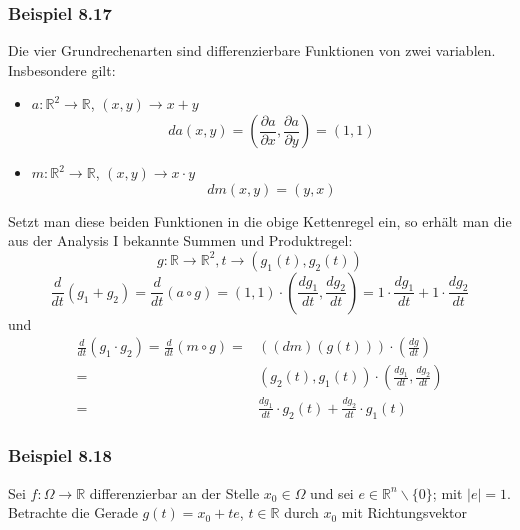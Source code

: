 \subsubsection*{Beispiel 8.17}
Die vier Grundrechenarten sind differenzierbare Funktionen von zwei variablen. Insbesondere gilt: 
\begin{itemize}
\item $a:\mathbb{R}^2\rightarrow\mathbb{R}$, $\left( x,y\right) \rightarrow x+y$ \[da\left( {x,y} \right) = \left( {\frac{{\partial a}}{{\partial x}},\frac{{\partial a}}{{\partial y}}} \right) = \left( {1,1} \right)\]
\item $m:\mathbb{R}^2\rightarrow \mathbb{R}$, $\left( x,y\right) \rightarrow x\cdot y$ \[dm\left( {x,y} \right) = \left( {y,x} \right)\]
\end{itemize}
Setzt man diese beiden Funktionen in die obige Kettenregel ein, so erhält man die aus der Analysis I bekannte Summen und Produktregel: 
$$g:\mathbb{R}\rightarrow\mathbb{R}^2, t\rightarrow \left( g_1(t),g_2(t)\right)$$
\[\frac{d}{{dt}}\left( {{g_1} + {g_2}} \right) = \frac{d}{{dt}}\left( {a \circ g} \right) = \left( {1,1} \right) \cdot \left( {\frac{{d{g_1}}}{{dt}},\frac{{d{g_2}}}{{dt}}} \right) = 1\cdot \frac{{d{g_1}}}{{dt}} + 1\cdot \frac{{d{g_2}}}{{dt}}\]
und 
\begin{align*}
\frac{d}{{dt}}\left( {{g_1} \cdot {g_2}} \right) = \frac{d}{{dt}}\left( {m \circ g} \right) = &\left( {\left( {dm} \right)\left( {g(t)} \right)} \right) \cdot \left( {\frac{{dg}}{{dt}}} \right)\\ 
= &\left( {{g_2}\left( t \right),{g_1}\left( t \right)} \right) \cdot \left( {\frac{{d{g_1}}}{{dt}},\frac{{d{g_2}}}{{dt}}} \right)\\ 
= &\frac{{d{g_1}}}{{dt}} \cdot {g_2}\left( t \right) + \frac{{d{g_2}}}{{dt}} \cdot {g_1}\left( t \right)
\end{align*}

\subsubsection*{Beispiel 8.18}
Sei $f:\Omega\rightarrow\mathbb{R}$ differenzierbar an der Stelle $x_0\in\Omega$ und sei $e\in\mathbb{R}^n\backslash\{ 0\}$; mit $\left| e\right|=1$. Betrachte die Gerade $g(t)=x_0+te$, $t\in\mathbb{R}$ durch $x_0$ mit Richtungsvektor 


